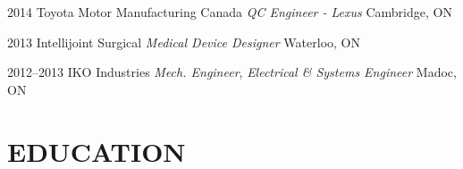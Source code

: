 \documentclass[a4paper,nocolors]{cv-friggeri-ben}
\begin{document}
\begin{entrylist}
\vspace{-12pt}
\entry
    {2014}
    {Toyota Motor Manufacturing Canada
        {\normalfont \emph{QC Engineer - Lexus}}
    }
    {Cambridge, ON}{}

\vspace{-12pt}
\entry
    {2013}
    {Intellijoint Surgical {\normalfont \emph{Medical Device Designer}}}
    {Waterloo, ON}{}

\vspace{-12pt}
\entry
    {2012--2013}
    {IKO Industries {\normalfont \emph{Mech. Engineer}, \emph{Electrical \& Systems Engineer}}}
    {Madoc, ON}{}
\end{entrylist}



\section{EDUCATION}
\end{document}
